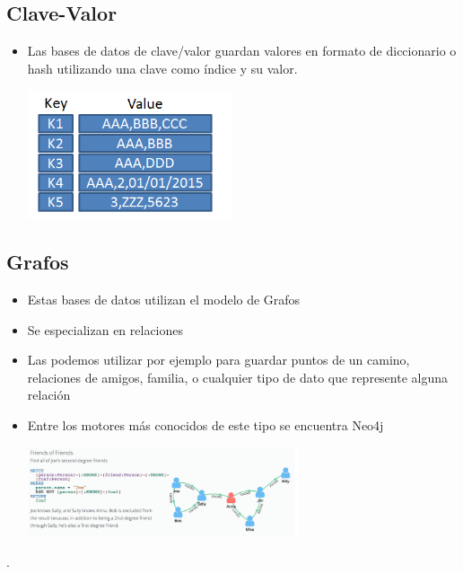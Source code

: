 \documentclass[%
 reprint,
 amsmath,amssymb,
 aps,
]{revtex4-1}
\begin{document}
\subsection{Clave-Valor}
\begin{itemize}

                     \item Las bases de datos de clave/valor guardan valores en formato de diccionario o hash utilizando una clave como índice y su valor.\cite{Nicolas}
                     \begin{center}
		\includegraphics[width=6cm]{./Imagenes/30}
		\end{center}	
	          \end{itemize}

\subsection{Grafos}
\begin{itemize}
		\item Estas bases de datos utilizan el modelo de Grafos
		\item Se especializan en relaciones
		\item Las podemos utilizar por ejemplo para guardar puntos de un camino, relaciones de amigos, familia, o cualquier tipo de  dato que represente alguna relación
                     \item Entre los motores más conocidos de este tipo se encuentra Neo4j
                     \begin{center}
		\includegraphics[width=8cm]{./Imagenes/4}
		\end{center}	
	          \end{itemize}
.
\end{document}
